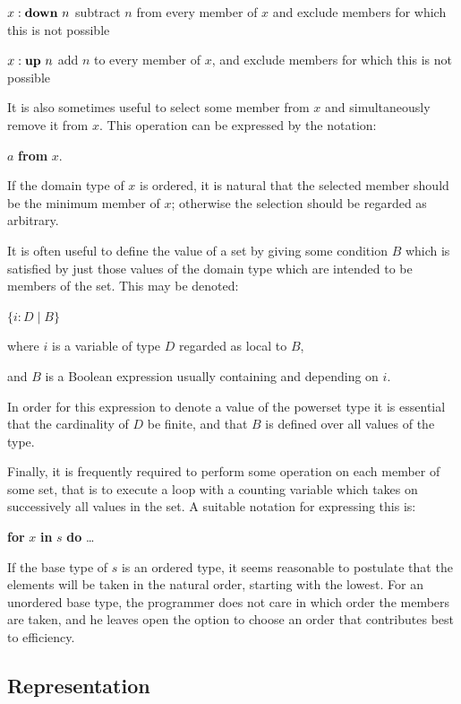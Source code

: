 \documentclass[twoside,11pt]{book}
\begin{document}
\noindent
{}\parindent$x:\text{\textbf{down} }n$ \tabto*{5em} subtract $n$ from every member of $x$ and exclude members for which this is not possible

\noindent
{}\parindent$x:\text{\textbf{up} } n$ \tabto*{5em} add $n$ to every member of $x$, and exclude members for which this is not possible

\noindent
It is also sometimes useful to select some member from $x$ and simultaneously remove it from $x$. This operation can be expressed by the notation:

\quad $a$ \textbf{from} $x$.

\noindent
If the domain type of $x$ is ordered, it is natural that the selected member should be the minimum member of $x$; otherwise the selection should be regarded as arbitrary.

It is often useful to define the value of a set by giving some condition $B$ which is satisfied by just those values of the domain type which are intended to be members of the set. This may be denoted:

\quad $\{i:D \mid B\}$

\noindent
where \tabto*{4em} $i$ is a variable of type $D$ regarded as local to $B$,

\noindent
and \tabto*{4em} $B$ is a Boolean expression usually containing and depending on $i$.

\noindent
In order for this expression to denote a value of the powerset type it is essential that the cardinality of $D$ be finite, and that $B$ is defined over all values of the type.

Finally, it is frequently required to perform some operation on each member of some set, that is to execute a loop with a counting variable which takes on successively all values in the set. A suitable notation for expressing this is:

\quad \textbf{for} $x$ \textbf{in} $s$ \textbf{do} \dots

\noindent
If the base type of $s$ is an ordered type, it seems reasonable to postulate that the elements will be taken in the natural order, starting with the lowest. For an unordered base type, the programmer does not care in which order the members are taken, and he leaves open the option to choose an order that contributes best to efficiency.

\subsection{Representation}
\end{document}
